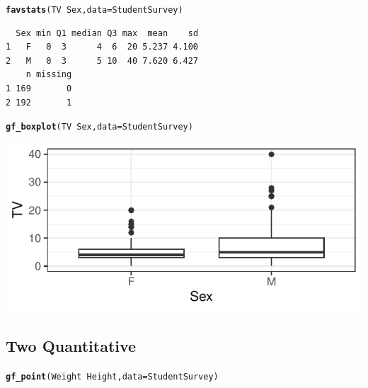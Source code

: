 \documentclass[10pt]{report}\usepackage[]{graphicx}\usepackage[]{xcolor}
\makeatletter
\newcommand{\hlopt}[1]{\textcolor[rgb]{0,0,0}{#1}}%
\newcommand{\hldef}[1]{\textcolor[rgb]{0.345,0.345,0.345}{#1}}%
\newcommand{\hlkwc}[1]{\textcolor[rgb]{0.333,0.667,0.333}{#1}}%
\newcommand{\hlkwd}[1]{\textcolor[rgb]{0.737,0.353,0.396}{\textbf{#1}}}%
\newenvironment{kframe}{%
 \def\at@end@of@kframe{}%
 \ifinner\ifhmode%
  \def\at@end@of@kframe{\end{minipage}}%
  \begin{minipage}{\columnwidth}%
 \fi\fi%
 \def\FrameCommand##1{\hskip\@totalleftmargin \hskip-\fboxsep
 \colorbox{shadecolor}{##1}\hskip-\fboxsep
     \hskip-\linewidth \hskip-\@totalleftmargin \hskip\columnwidth}%
 \MakeFramed {\advance\hsize-\width
   \@totalleftmargin\z@ \linewidth\hsize
   \@setminipage}}%
 {\par\unskip\endMakeFramed%
 \at@end@of@kframe}
\newenvironment{knitrout}{}{} %
\makeatother
\begin{document}
\begin{multicols}{3}
\begin{knitrout}\small
{}\color{fgcolor}\begin{kframe}
\begin{alltt}
\hlkwd{favstats}\hldef{(TV} \hlopt{~} \hldef{Sex,} \hlkwc{data} \hldef{= StudentSurvey)}
\end{alltt}
\begin{verbatim}
  Sex min Q1 median Q3 max  mean    sd
1   F   0  3      4  6  20 5.237 4.100
2   M   0  3      5 10  40 7.620 6.427
    n missing
1 169       0
2 192       1
\end{verbatim}
\end{kframe}
\end{knitrout}
\vspace*{-.15in}

\begin{knitrout}\small
{}\color{fgcolor}\begin{kframe}
\begin{alltt}
\hlkwd{gf_boxplot}\hldef{(TV} \hlopt{~} \hldef{Sex,} \hlkwc{data} \hldef{= StudentSurvey)}
\end{alltt}
\end{kframe}

{\centering \includegraphics[width=.25\textwidth,height=.125\textwidth]{figure/bwplot-1} 

}


\end{knitrout}
\vspace*{-.15in}

\subsection*{Two Quantitative}
\vspace*{-.15in}

\begin{knitrout}\small
{}\color{fgcolor}\begin{kframe}
\begin{alltt}
\hlkwd{gf_point}\hldef{(Weight} \hlopt{~} \hldef{Height,} \hlkwc{data} \hldef{= StudentSurvey)}
\end{alltt}
\end{kframe}


\end{knitrout}
\end{multicols}
\end{document}

